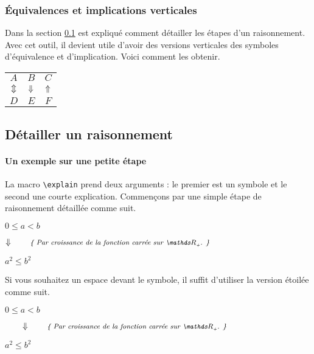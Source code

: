 \documentclass[12pt,a4paper]{article}
\theoremstyle{definition}
\begin{document}
    	\subsubsection{Équivalences et implications verticales}

Dans la section \ref{explain-proof} est expliqué comment détailler les étapes d'un raisonnement. Avec cet outil, il devient utile d'avoir des versions verticales des symboles d'équivalence et d'implication. Voici comment les obtenir.

\begin{tcblisting}{}
\begin{tabular}{ccc}
    $A$       &   $B$           &   $C$         \\
    $\viff$   &   $\vimplies$   &   $\vliesimp$ \\
    $D$       &   $E$           &   $F$
\end{tabular}
\end{tcblisting}





    \subsection{Détailler un raisonnement} \label{explain-proof}
    
	    \paragraph{Un exemple sur une petite étape}
    
La macro \verb+\explain+ prend deux arguments : le premier est un symbole et le second une courte explication. Commençons par une simple étape de raisonnement détaillée comme suit.

\begin{tcblisting}{}
$0 \leq a < b$

$\explain{\vimplies}{Par croissance de la fonction carrée sur $\RRp$.}$

$a^2 \leq b^2$
\end{tcblisting}

Si vous souhaitez un espace devant le symbole, il suffit d'utiliser la version étoilée comme suit.

\begin{tcblisting}{}
$0 \leq a < b$

$\explain*{\vimplies}{Par croissance de la fonction carrée sur $\RRp$.}$

$a^2 \leq b^2$
\end{tcblisting}
	
\end{document}
